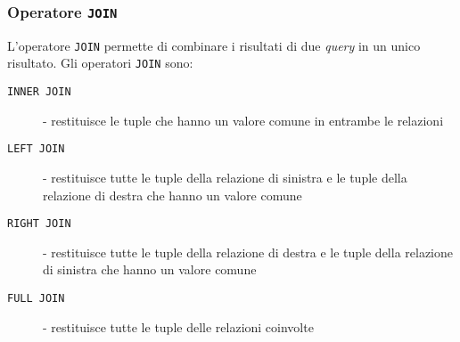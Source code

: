        \subsubsection{Operatore \texttt{JOIN}}
            L'operatore \texttt{JOIN} permette di combinare i risultati di due \textit{query} in un unico risultato. Gli operatori \texttt{JOIN} sono:
            \begin{description}
                \item[\texttt{INNER JOIN}] - restituisce le tuple che hanno un valore comune in entrambe le relazioni
                \item[\texttt{LEFT JOIN}] - restituisce tutte le tuple della relazione di sinistra e le tuple della relazione di destra che hanno un valore comune
                \item[\texttt{RIGHT JOIN}] - restituisce tutte le tuple della relazione di destra e le tuple della relazione di sinistra che hanno un valore comune
                \item[\texttt{FULL JOIN}] - restituisce tutte le tuple delle relazioni coinvolte
            \end{description}